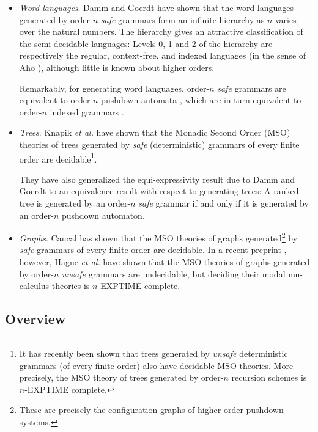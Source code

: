 \begin{itemize}
\item \emph{Word languages}. Damm and Goerdt \cite{DG86} have shown
  that the word languages generated by order-$n$ \emph{safe} grammars
  form an infinite hierarchy as $n$ varies over the natural numbers.
  The hierarchy gives an attractive classification of the
  semi-decidable languages: Levels 0, 1 and 2 of the hierarchy are
  respectively the regular, context-free, and indexed languages (in
  the sense of Aho \cite{Aho68}), although little is known about
  higher orders.

  Remarkably, for generating word languages, order-$n$ \emph{safe}
  grammars are equivalent to order-$n$ pushdown automata \cite{DG86},
  which are in turn equivalent to order-$n$ indexed grammars
  \cite{Mas74,Mas76}.

\item \emph{Trees}. Knapik \emph{et al.} have shown that the Monadic
  Second Order (MSO) theories of trees generated by \emph{safe}
  (deterministic) grammars of every finite order are
  decidable\footnote{It has recently been shown
    \cite{OngLics2006} that trees generated by \emph{unsafe}
    deterministic grammars (of every finite order) also have decidable
    MSO theories. More precisely, the MSO theory of trees generated by order-$n$
recursion schemes is $n$-EXPTIME complete.}.

  They have also generalized the equi-expressivity result due to Damm
  and Goerdt \cite{DG86} to an equivalence result with respect to
  generating trees: A ranked tree is generated by an order-$n$ \emph{safe}
  grammar if and only if it is generated by an order-$n$ pushdown
  automaton.

\item \emph{Graphs}. Caucal \cite{Cau02} has shown that the MSO
  theories of graphs generated\footnote{These are precisely the
    configuration graphs of higher-order pushdown systems.} by
  \emph{safe} grammars of every finite order are decidable. In a recent preprint \cite{hague-sto07}, however,
  Hague \emph{et al.} have
  shown that the MSO theories of graphs generated by order-$n$
  \emph{unsafe} grammars are undecidable, but deciding their modal
  mu-calculus theories is $n$-EXPTIME complete.
\end{itemize}

\subsection*{Overview}

